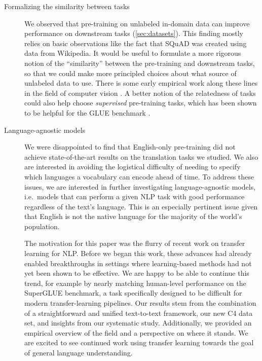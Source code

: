 \documentclass[twoside,11pt]{article}
\begin{document}
\begin{description}
\item[Formalizing the similarity between tasks] We observed that pre-training on unlabeled in-domain data can improve performance on downstream tasks (\cref{sec:datasets}).
This finding mostly relies on basic observations like the fact that SQuAD was created using data from Wikipedia.
It would be useful to formulate a more rigorous notion of the ``similarity'' between the pre-training and downstream tasks, so that we could make more principled choices about what source of unlabeled data to use.
There is some early empirical work along these lines in the field of computer vision \citep{huh2016makes,kornblith2018better,he2018rethinking}.
A better notion of the relatedness of tasks could also help choose \textit{supervised} pre-training tasks, which has been shown to be helpful for the GLUE benchmark \citep{phang2018sentence}.

\item[Language-agnostic models] We were disappointed to find that English-only pre-training did not achieve state-of-the-art results on the translation tasks we studied.
We also are interested in avoiding the logistical difficulty of needing to specify which languages a vocabulary can encode ahead of time.
To address these issues, we are interested in further investigating language-agnostic models, i.e.\ models that can perform a given NLP task with good performance regardless of the text's language.
This is an especially pertinent issue given that English is not the native language for the majority of the world's population.

The motivation for this paper was the flurry of recent work on transfer learning for NLP.
Before we began this work, these advances had already enabled breakthroughs in settings where learning-based methods had not yet been shown to be effective.
We are happy to be able to continue this trend, for example by nearly matching human-level performance on the SuperGLUE benchmark, a task specifically designed to be difficult for modern transfer-learning pipelines.
Our results stem from the combination of a straightforward and unified text-to-text framework, our new C4 data set, and insights from our systematic study.
Additionally, we provided an empirical overview of the field and a perspective on where it stands.
We are excited to see continued work using transfer learning towards the goal of general language understanding.

\end{description}
\end{document}
